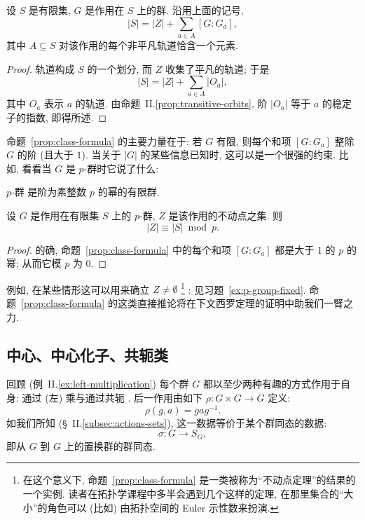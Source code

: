 \begin{proposition}
\label{prop:class-formula}
设 $S$ 是有限集, $G$ 是作用在 $S$ 上的群. 沿用上面的记号,
\[
|S| = |Z| + \sum_{a \in A} [G:G_a],
\]
其中 $A \subseteq S$ 对该作用的每个非平凡轨道恰含一个元素.
\end{proposition}

\begin{proof}
轨道构成 $S$ 的一个划分, 而 $Z$ 收集了平凡的轨道; 于是
\[
|S| = |Z| + \sum_{a \in A} |O_a|,
\]
其中 $O_a$ 表示 $a$ 的轨道. 由命题~II.\ref{prop:transitive-orbits}, 阶 $|O_a|$ 等于 $a$ 的稳定子的指数, 即得所述.
\end{proof}

命题~\ref{prop:class-formula} 的主要力量在于: 若 $G$ 有限, 则每个和项 $[G:G_a]$ 整除 $G$ 的阶 (且大于 $1$). 当关于 $|G|$ 的某些信息已知时, 这可以是一个很强的约束. 比如, 看看当 $G$ 是 $p$-群时它说了什么:

\begin{definition}
\label{def:p-group}
$p$-群%
是阶为素整数 $p$ 的幂的有限群.
\end{definition}

\begin{corollary}
\label{cor:fixed-points}
设 $G$ 是作用在有限集 $S$ 上的 $p$-群, $Z$ 是该作用的不动点之集. 则
\[
|Z| \equiv |S| \bmod p.
\]
\end{corollary}

\begin{proof}
的确, 命题~\ref{prop:class-formula} 中的每个和项 $[G:G_a]$ 都是大于 $1$ 的 $p$ 的幂; 从而它模 $p$ 为 $0$.
\end{proof}

例如, 在某些情形这可以用来确立 $Z \neq \emptyset$%
\footnote{在这个意义下, 命题~\ref{prop:class-formula} 是一类被称为``不动点定理''的结果的一个实例. 读者在拓扑学课程中多半会遇到几个这样的定理, 在那里集合的``大小''的角色可以 (比如) 由拓扑空间的 Euler 示性数来扮演.}%
: 见习题~\ref{ex:p-group-fixed}. 命题~\ref{prop:class-formula} 的这类直接推论将在下文西罗定理的证明中助我们一臂之力.

\subsection{中心、中心化子、共轭类}
\label{subsec:center-conjugacy}

回顾 (例~II.\ref{ex:left-multiplication}) 每个群 $G$ 都以至少两种有趣的方式作用于自身: 通过 (左) 乘与通过共轭%
. 后一作用由如下 $\rho : G \times G \to G$ 定义:
\[
\rho(g, a) = gag^{-1}.
\]
如我们所知 (\S~II.\ref{subsec:actions-sets}), 这一数据等价于某个群同态的数据:
\[
\sigma : G \to S_G,
\]
即从 $G$ 到 $G$ 上的置换群的群同态.

